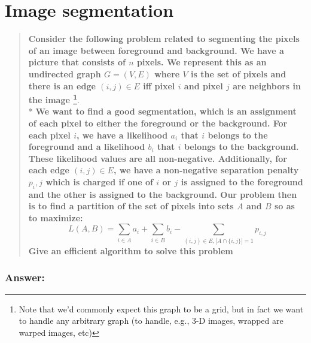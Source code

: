 \documentclass[titlepage]{article}\usepackage[]{graphicx}\usepackage[]{color}
\begin{document}
  \vspace{9cm}



\section{Image segmentation}
  \begin{quote}
    \textbf{Consider the following problem related to segmenting the pixels
      of an image between foreground and background. We have a picture that
      consists of $n$ pixels. We represent this as an undirected graph $G =
      (V,E)$ where $V$ is the set of pixels and there is an edge $(i,j) \in
      E$ iff pixel $i$ and pixel $j$ are neighbors in the image
      \footnote{Note that we’d commonly expect this graph to be a grid, but
        in fact we want to handle any arbitrary graph (to handle, e.g., 3-D
      images, wrapped are warped images, etc)}}. \\* \textbf{We want to find
        a good segmentation, which is an assignment of each pixel to either
        the foreground or the background.  For each pixel $i$, we have a
        likelihood $a_i$ that $i$ belongs to the foreground and a likelihood
        $b_i$ that $i$ belongs to the background. These likelihood values are
        all non-negative. Additionally, for each edge $(i, j) \in E$, we have
        a non-negative separation penalty $p_i,j$ which is charged if one of
        $i$ or $j$ is assigned to the foreground and the other is assigned to
        the background.  Our problem then is to find a partition of the set
        of pixels into sets $A$ and $B$ so as to maximize:}
    \[ L(A, B) = \sum_{i \in A}  a_i + \sum_{i \in B} b_i − \sum_{(i,j) \in E, | A \cap \{i,j\} | = 1} p_{i,j} \]
      \textbf{Give an efficient algorithm to solve this problem}
  \end{quote}

  \subsubsection{Answer:}

  \vspace{9cm}
\end{document}
